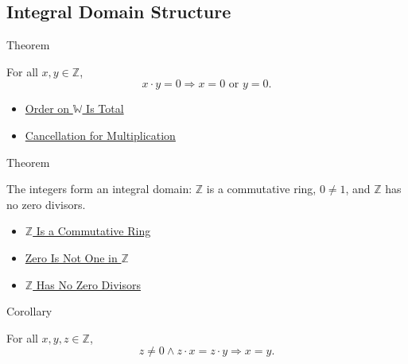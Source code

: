\subsection*{Integral Domain Structure}

\begin{theorembox}{Theorem}
\begin{theorem}
\label{thm:z-has-no-zero-divisors}
For all $x,y\in\mathbb{Z}$,
\[
x\cdot y=0 \Longrightarrow x=0 \text{ or } y=0.
\]
\end{theorem}
\end{theorembox}

\begin{dependencies}
\begin{itemize}
  \item \hyperref[thm:order-on-w-total]{Order on $\mathbb{W}$ Is Total}
  \item \hyperref[thm:multiplication-cancellation]{Cancellation for Multiplication}
\end{itemize}
\end{dependencies}

\begin{theorembox}{Theorem}
\begin{theorem}
\label{thm:z-integral-domain}
The integers form an integral domain: $\mathbb{Z}$ is a commutative ring,
$0\ne 1$, and $\mathbb{Z}$ has no zero divisors.
\end{theorem}
\end{theorembox}

\begin{dependencies}
\begin{itemize}
  \item \hyperref[thm:z-commutative-ring]{$\mathbb{Z}$ Is a Commutative Ring}
  \item \hyperref[thm:zero-not-one-in-z]{Zero Is Not One in $\mathbb{Z}$}
  \item \hyperref[thm:z-has-no-zero-divisors]{$\mathbb{Z}$ Has No Zero Divisors}
\end{itemize}
\end{dependencies}

\begin{corollarybox}{Corollary}
\begin{corollary}
\label{cor:multiplicative-cancellation-on-z}
For all $x,y,z\in\mathbb{Z}$,
\[
z\ne 0 \land z\cdot x=z\cdot y \Longrightarrow x=y.
\]
\end{corollary}
\end{corollarybox}


